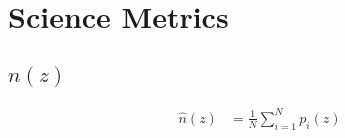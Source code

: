 \documentclass[\docopts]{\docclass}
\begin{document}







\section{Science Metrics}
\label{sec:science}



\subsection{$n(z)$}
\label{sec:nz}

\begin{align}
\hat{n}(z) &= \frac{1}{N}\sum_{i=1}^{N}p_{i}(z)
\label{eq:nz}
\end{align}



\end{document}
